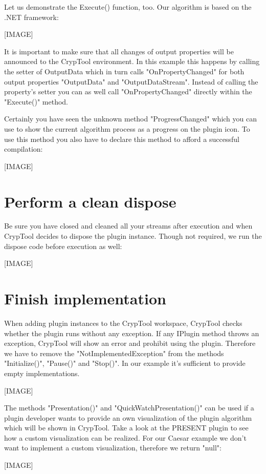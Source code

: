 Let us demonstrate the Execute() function, too. Our algorithm is based on the .NET framework:

[IMAGE]

It is important to make sure that all changes of output properties will be announced to the CrypTool environment. In this example this happens by calling the setter of OutputData which in turn calls "OnPropertyChanged" for both output properties "OutputData" and "OutputDataStream". Instead of calling the property's setter you can as well call "OnPropertyChanged" directly within the "Execute()" method.

Certainly you have seen the unknown method "ProgressChanged" which you can use to show the current algorithm process as a progress on the plugin icon.
To use this method you also have to declare this method to afford a successful compilation:

[IMAGE]

\section{Perform a clean dispose}\label{sec:PerformACleanDispose}
Be sure you have closed and cleaned all your streams after execution and when CrypTool decides to dispose the plugin instance. Though not required, we run the dispose code before execution as well:

[IMAGE]
\section{Finish implementation}\label{sec:FinishImplementation}
When adding plugin instances to the CrypTool workspace, CrypTool checks whether the plugin runs without any exception. If any IPlugin method throws an exception, CrypTool will show an error and prohibit using the plugin. Therefore we have to remove the "NotImplementedException" from the methods "Initialize()", "Pause()" and "Stop()". In our example it's sufficient to provide empty implementations.

[IMAGE]

The methods "Presentation()" and "QuickWatchPresentation()" can be used if a plugin developer wants to provide an own visualization of the plugin algorithm which will be shown in CrypTool. Take a look at the PRESENT plugin to see how a custom visualization can be realized. For our Caesar example we don't want to implement a custom visualization, therefore we return "null":

[IMAGE]


